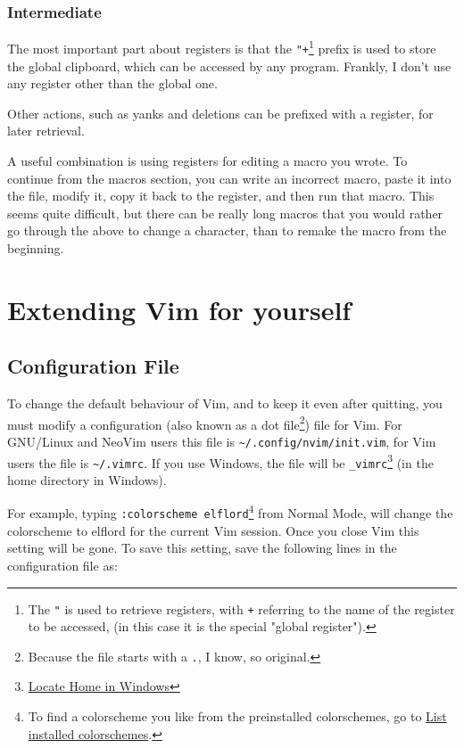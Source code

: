 \documentclass[11pt]{article}
\begin{document}
\subsubsection{Intermediate}
\label{sec:org606db12}
The most important part about registers is that the \texttt{"+}\footnote{The \texttt{"} is used to retrieve registers, with \texttt{+} referring to the name
of the register to be accessed, (in this case it is the special "global
register").} prefix is used to store
the global clipboard, which can be accessed by any program. Frankly, I
don't use any register other than the global one.

Other actions, such as yanks and deletions can be prefixed with a register, for
later retrieval.

A useful combination is using registers for editing a macro you wrote. To
continue from the macros section, you can write an incorrect macro, paste it
into the file, modify it, copy it back to the register, and then run that macro.
This seems quite difficult, but there can be really long macros that you would
rather go through the above to change a character, than to remake the macro
from the beginning.
\section{Extending Vim for yourself}
\label{sec:org55b17fa}
\subsection{Configuration File}
\label{sec:orge1a146b}
To change the default behaviour of Vim, and to keep it even after quitting, you
must modify a configuration (also known as a dot file\footnote{Because the file starts with a \texttt{.}, I know, so original.}) file for Vim. For
GNU/Linux and NeoVim users this file is \texttt{\textasciitilde{}/.config/nvim/init.vim}, for Vim users
the file is \texttt{\textasciitilde{}/.vimrc}. If you use Windows, the file will be \texttt{\_vimrc}\footnote{\href{https://superuser.com/questions/86246/where-should-the-vimrc-file-be-located-on-windows-7}{Locate Home in Windows}} (in
the home directory in Windows).

For example, typing \texttt{:colorscheme elflord}\footnote{To find a colorscheme you like from the preinstalled colorschemes, go to \href{https://stackoverflow.com/questions/7331940/how-to-get-the-list-of-all-installed-color-schemes-in-vim}{List
installed colorschemes}.} from Normal Mode, will change
the colorscheme to elflord for the current Vim session. Once you close Vim this
setting will be gone. To save this setting, save the following lines in the
configuration file as:
\end{document}
